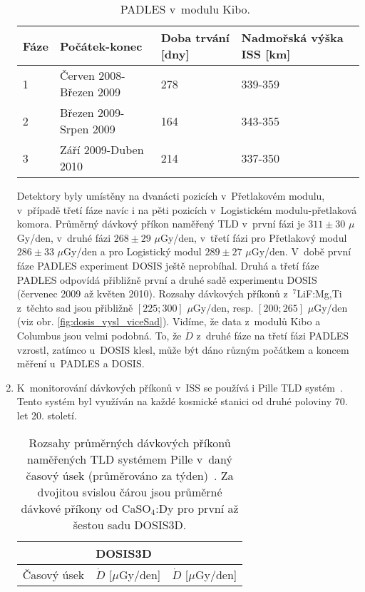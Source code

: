 \begin{enumerate}
	\begin{table}[ht]
	  \centering
	  \caption{PADLES v~modulu Kibo.~\cite{japonsky}}
	  \label{tab:dosis_kibo}
	  \begin{tabular}{llll}
		\toprule
	Fáze&Počátek-konec&Doba trvání [dny]&Nadmořská výška ISS [km]\\
	\midrule
	1&Červen 2008-Březen 2009&278&339-359\\
	2&Březen 2009-Srpen 2009&164&343-355\\
	3&Září 2009-Duben 2010&214&337-350\\
	\bottomrule
	  \end{tabular}
	\end{table}
	Detektory byly umístěny na dvanácti pozicích v~Přetlakovém modulu, v~případě třetí fáze navíc i na pěti pozicích v~Logistickém modulu-přetlaková komora. Průměrný dávkový příkon naměřený TLD v~první fázi je $311\pm 30$ $\mu$Gy/den, v~druhé fázi $268\pm29$ $\mu$Gy/den, v~třetí fázi pro Přetlakový modul $286\pm33$ $\mu$Gy/den a pro Logistický modul $289\pm27$ $\mu$Gy/den. V~době první fáze PADLES experiment DOSIS ještě neprobíhal. Druhá a třetí fáze PADLES odpovídá přibližně první a druhé sadě experimentu DOSIS (červenec 2009 až květen 2010). Rozsahy dávkových příkonů z~$^7$LiF:Mg,Ti z~těchto sad jsou přibližně $[225;300]$ $\mu$Gy/den, resp. $[200;265]$ $\mu$Gy/den (viz obr. \ref{fig:dosis_vysl_viceSad}). Vidíme, že data z~modulů Kibo a Columbus jsou velmi podobná. To, že $\dot{D}$
z~druhé fáze na třetí fázi PADLES vzrostl, zatímco u~DOSIS klesl, může být dáno různým počátkem a koncem měření u~PADLES a DOSIS.~\cite{japonsky}
  \item K~monitorování dávkových příkonů v~ISS se používá i Pille TLD systém~\cite{pilleClanek}. Tento systém byl využíván na každé kosmické stanici od druhé poloviny 70. let 20. století.
\newcommand{\mytoprule}{\specialrule{1pt}{0em}{0em}}
\newcommand{\mybottomrule}{\specialrule{1pt}{0em}{0em}} 
	\begin{table}[ht]
	  \centering
	  \caption{Rozsahy průměrných dávkových příkonů naměřených TLD systémem Pille v~daný časový úsek (průměrováno za týden)~\cite{pille, pille2}. Za dvojitou svislou čárou jsou průměrné dávkové příkony od CaSO$_4$:Dy pro první až šestou sadu DOSIS3D.}
	  \label{tab:dosis_pille}
	  \begin{tabular}{ll|l}
		\mytoprule
		\multicolumn{2}{c|}{Pille-Zvezda}&DOSIS3D\\
		\hline
		Časový úsek&$\dot{D}$ [$\mu$Gy/den]&$\dot{D}$ [$\mu$Gy/den]\\

\end{tabular}
\end{table}
\end{enumerate}
